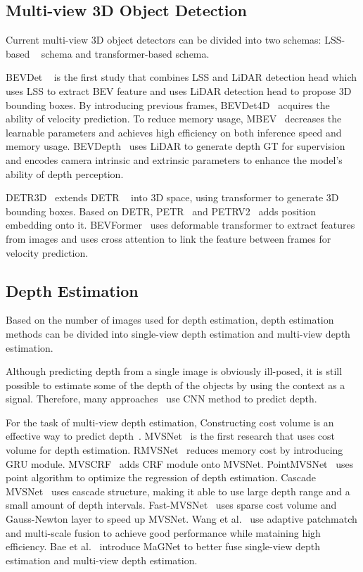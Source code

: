 \documentclass[letterpaper]{article} \usepackage[]{aaai23}  \usepackage{times}  \usepackage{helvet}  \usepackage{courier}  \usepackage[hyphens]{url}  \usepackage{graphicx} \urlstyle{rm} \def\UrlFont{\rm}  \usepackage{natbib}  \usepackage{caption} \frenchspacing  \setlength{\pdfpagewidth}{8.5in} \setlength{\pdfpageheight}{11in} \usepackage{algorithm}
\begin{document}
\subsection{Multi-view 3D Object Detection}
Current multi-view 3D object detectors can be divided into two schemas: LSS-based ~\cite{philion2020lift} schema and transformer-based schema. 

BEVDet ~\cite{huang2021bevdet} is the first study that combines LSS and LiDAR detection head which uses LSS to extract BEV feature and uses LiDAR detection head to propose 3D bounding boxes. By introducing previous frames, BEVDet4D~\cite{huang2022bevdet4d} acquires the ability of velocity prediction. To reduce memory usage, MBEV~\cite{xie2022m}  decreases the learnable parameters and achieves high efficiency on both inference speed and memory usage. BEVDepth~\cite{li2022bevdepth} uses LiDAR to generate depth GT for supervision and encodes camera intrinsic and extrinsic parameters to enhance the model's ability of depth perception.

DETR3D~\cite{wang2022detr3d} extends DETR ~\cite{carion2020end} into 3D space, using transformer to generate 3D bounding boxes. Based on DETR, PETR~\cite{liu2022petr} and PETRV2~\cite{liu2022petrv2} adds position embedding onto it. BEVFormer~\cite{li2022bevformer} uses deformable transformer to extract features from images and uses cross attention to link the feature between frames for velocity prediction. 

\subsection{Depth Estimation}
Based on the number of images used for depth estimation, depth estimation methods can be divided into single-view depth estimation and multi-view depth estimation.

Although predicting depth from a single image is obviously ill-posed, it is still possible to estimate some of the depth of the objects by using the context as a signal. Therefore, many approaches~\cite{bhat2021adabins, eigen2015predicting, eigen2014depth, fu2018deep} use CNN method to predict depth.

For the task of multi-view depth estimation, Constructing cost volume is an effective way to predict depth~\cite{mvs_survery, aa_rmvsnet, bidirectional}. MVSNet~\cite{yao2018mvsnet} is the first research that uses cost volume for depth estimation. RMVSNet~\cite{yao2019recurrent} reduces memory cost by introducing GRU module. MVSCRF~\cite{xue2019mvscrf} adds CRF module onto MVSNet. PointMVSNet~\cite{chen2019point} uses point algorithm to optimize the regression of depth estimation. Cascade MVSNet~\cite{gu2020cascade} uses cascade structure, making it able to use large depth range and a small amount of depth intervals. Fast-MVSNet~\cite{yu2020fast} uses sparse cost volume and Gauss-Newton layer to speed up MVSNet. Wang et al.~\cite{wang2021patchmatchnet} use adaptive patchmatch and multi-scale fusion to achieve good performance while mataining high efficiency. Bae et al.~\cite{bae2022multi} introduce MaGNet to better fuse single-view depth estimation and multi-view depth estimation.
\end{document}
